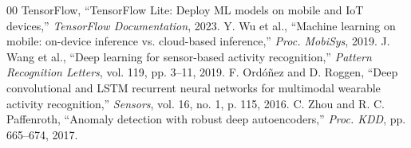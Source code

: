 \documentclass[conference]{IEEEtran}
\begin{document}
\begin{thebibliography}{00}
 TensorFlow, ``TensorFlow Lite: Deploy ML models on mobile and IoT devices,'' \textit{TensorFlow Documentation}, 2023.
 Y. Wu et al., ``Machine learning on mobile: on-device inference vs. cloud-based inference,'' \textit{Proc. MobiSys}, 2019.
 J. Wang et al., ``Deep learning for sensor-based activity recognition,'' \textit{Pattern Recognition Letters}, vol. 119, pp. 3--11, 2019.
 F. Ordóñez and D. Roggen, ``Deep convolutional and LSTM recurrent neural networks for multimodal wearable activity recognition,'' \textit{Sensors}, vol. 16, no. 1, p. 115, 2016.
 C. Zhou and R. C. Paffenroth, ``Anomaly detection with robust deep autoencoders,'' \textit{Proc. KDD}, pp. 665--674, 2017.
\end{thebibliography}
\end{document}
